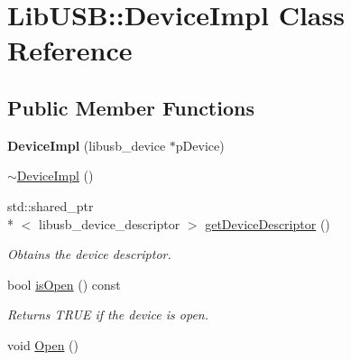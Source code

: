 \hypertarget{class_lib_u_s_b_1_1_device_impl}{\section{Lib\-U\-S\-B\-:\-:Device\-Impl Class Reference}
\label{class_lib_u_s_b_1_1_device_impl}
}
\subsection*{Public Member Functions}
\begin{DoxyCompactItemize}
\item 
\hypertarget{class_lib_u_s_b_1_1_device_impl_a115cb08feaa8115ea5460fd1043364d9}{{\bfseries Device\-Impl} (libusb\-\_\-device $\ast$p\-Device)}\label{class_lib_u_s_b_1_1_device_impl_a115cb08feaa8115ea5460fd1043364d9}

\item 
\hyperlink{class_lib_u_s_b_1_1_device_impl_afa50228d3c4c532fef55e7449a051ea9}{$\sim$\-Device\-Impl} ()
\item 
\hypertarget{class_lib_u_s_b_1_1_device_impl_ac2920f6e16a26937e7a49279101a0e6d}{std\-::shared\-\_\-ptr\\*
$<$ libusb\-\_\-device\-\_\-descriptor $>$ \hyperlink{class_lib_u_s_b_1_1_device_impl_ac2920f6e16a26937e7a49279101a0e6d}{get\-Device\-Descriptor} ()}\label{class_lib_u_s_b_1_1_device_impl_ac2920f6e16a26937e7a49279101a0e6d}

\begin{DoxyCompactList}\small\item\em Obtains the device descriptor. \end{DoxyCompactList}\item 
\hypertarget{class_lib_u_s_b_1_1_device_impl_a3a445a7a506079244e8dfc77f8e5d226}{bool \hyperlink{class_lib_u_s_b_1_1_device_impl_a3a445a7a506079244e8dfc77f8e5d226}{is\-Open} () const }\label{class_lib_u_s_b_1_1_device_impl_a3a445a7a506079244e8dfc77f8e5d226}

\begin{DoxyCompactList}\small\item\em Returns T\-R\-U\-E if the device is open. \end{DoxyCompactList}\item 
\hypertarget{class_lib_u_s_b_1_1_device_impl_a4464680f5742d789c14ecc30ea62edc8}{void \hyperlink{class_lib_u_s_b_1_1_device_impl_a4464680f5742d789c14ecc30ea62edc8}{Open} ()}\label{class_lib_u_s_b_1_1_device_impl_a4464680f5742d789c14ecc30ea62edc8}


\end{DoxyCompactItemize}
